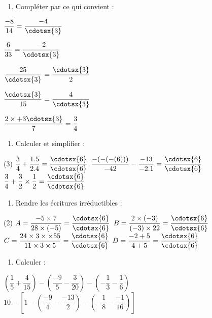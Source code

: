 \documentclass[a4paper,12pt]{article}
\begin{document}
\devoir[prv=true,ds=false,num=1 ,niv=2 ,date=12/10/2023,Rdate=23/10/2023]

\begin{exo}
\begin{enumerate}
\item Compléter par ce qui convient :
\end{enumerate}
\begin{itemize*}
\item $\dfrac{-8}{14}=\dfrac{-4}{\cdotsx{3}}$
\item $\dfrac{6}{33}=\dfrac{-2}{\cdotsx{3}}$
\item $\dfrac{25}{\cdotsx{3}}=\dfrac{\cdotsx{3}}{2}$
\item $\dfrac{\cdotsx{3}}{15}=\dfrac{4}{\cdotsx{3}}$
\item $\dfrac{2\times+3 \cdotsx{3}}{7}=\dfrac{3}{4}$
\end{itemize*}
\end{exo}

\begin{exo}
\begin{enumerate}
\item Calculer et simplifier :
\end{enumerate}
\begin{tasks}[style=itemize](3)
\task $\dfrac{3}{4}+\dfrac{1.5}{2.4}=\dfrac{\cdotsx{6}}{\cdotsx{6}}$
\task* $\dfrac{-(-(-(6)))}{-42}-\dfrac{-13}{-2.1}=\dfrac{\cdotsx{6}}{\cdotsx{6}}$
\task  $\dfrac{3}{4}+\dfrac{3}{2}\times \dfrac{1}{2}=\dfrac{\cdotsx{6}}{\cdotsx{6}}$
\end{tasks}
\end{exo}

\begin{exo}
\begin{enumerate}
\item Rendre les écritures irréductibles :
\end{enumerate}
\begin{tasks}[style=itemize](2)
\task $A=\dfrac{-5\times7}{28\times(-5)} =\dfrac{\cdotsx{6}}{\cdotsx{6}}$
\task $B=\dfrac{2\times(-3)}{(-3)\times22}=\dfrac{\cdotsx{6}}{\cdotsx{6}}$
\task $C=\dfrac{24\times3\times\times55}{11\times3\times5}=\dfrac{\cdotsx{6}}{\cdotsx{6}}$
\task $D=\dfrac{-2+5}{4+5}=\dfrac{\cdotsx{6}}{\cdotsx{6}}$
\end{tasks}
\end{exo}

\begin{exo}
\begin{enumerate}
\item Calculer :
\end{enumerate}
\begin{tasks}
\task $\left( \dfrac{1}{5}+\dfrac{4}{15}\right) -\left( \dfrac{-9}{5}-\dfrac{3}{20}\right) -\left( -\dfrac{1}{3}-\dfrac{1}{6} \right)$
\task $ 10 -\left[ 1-\left( \dfrac{-9}{4}-\dfrac{-13}{2}\right) -\left( -\dfrac{1}{8}-\dfrac{-1}{16} \right)\right]$
\end{tasks}
\end{exo}
\end{document}
